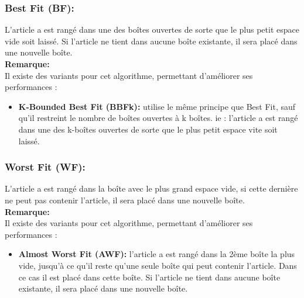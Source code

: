 \documentclass[class=report, crop=false]{standalone}
\begin{document}
        \subsubsection{Best Fit (BF):} L’article a est rangé dans une des boîtes ouvertes de sorte que le plus petit espace vide soit laissé. Si l’article ne tient dans aucune boîte existante, il sera placé dans une nouvelle boîte. 
        \\ \textbf{Remarque:} \\
        Il existe des variants pour cet algorithme, permettant d’améliorer ses performances : 
        \renewcommand{\labelitemi}{$\circ$}  
        \begin{itemize}
            \item \textbf{K-Bounded Best Fit (BBFk): } utilise le même principe que Best Fit, sauf qu’il restreint le nombre de boîtes ouvertes à k boîtes. ie : l’article a est rangé dans une des k-boîtes ouvertes de sorte que le plus petit espace vite soit laissé. 
        \end{itemize}
        \subsubsection{Worst Fit (WF): }L’article a est rangé dans la boîte avec le plus grand espace vide, si cette dernière ne peut pas contenir l’article, il sera placé dans une nouvelle boîte.
        \\ \textbf{Remarque:} \\
        Il existe des variants pour cet algorithme, permettant d’améliorer ses performances : 
        \renewcommand{\labelitemi}{$\circ$}  
        \begin{itemize}
            \item \textbf{Almost Worst Fit (AWF): }l’article a est rangé dans la 2ème boîte la plus vide, jusqu’à ce qu’il reste qu’une seule boîte qui peut contenir l’article. Dans ce cas il est placé dans cette boîte. Si l’article ne tient dans aucune boîte existante, il sera placé dans une nouvelle boîte.
        \end{itemize}
\end{document}
